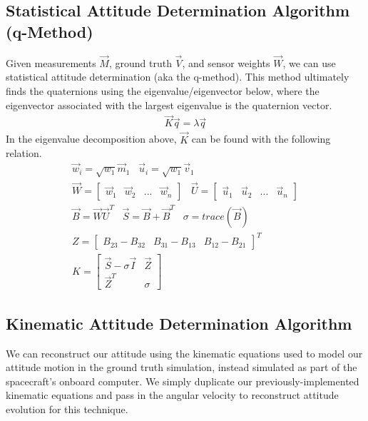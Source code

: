 \subsection{Statistical Attitude Determination Algorithm (q-Method)}
Given measurements $\Vec{M}$, ground truth $\Vec{V}$, and sensor weights $\Vec{W}$, we can use statistical attitude determination (aka the q-method). This method ultimately finds the quaternions using the eigenvalue/eigenvector below, where the eigenvector associated with the largest eigenvalue is the quaternion vector.
\begin{align*}
    \Vec{K} \Vec{q} = \lambda \Vec{q}
\end{align*}
In the eigenvalue decomposition above, $\Vec{K}$ can be found with the following relation.
\begin{align*}
    \Vec{w}_i = \sqrt{w_1} \Vec{m}_1 \;\;\;
    \Vec{u}_i = \sqrt{w_1} \Vec{v}_1 \\
    \Vec{W} = 
    \begin{bmatrix}
        \Vec{w}_1 & \Vec{w}_2 & ... & \Vec{w}_n
    \end{bmatrix} \;\;\;
    \Vec{U} = 
    \begin{bmatrix}
        \Vec{u}_1 & \Vec{u}_2 & ... & \Vec{u}_n
    \end{bmatrix} \\
    \Vec{B} = \Vec{W} \Vec{U}^T \;\;\;
    \Vec{S} = \Vec{B} + \Vec{B}^T \;\;\;
    \sigma = trace (\Vec{B}) \\
    Z = 
    \begin{bmatrix}
        B_{23} - B_{32} & B_{31} - B_{13} & B_{12} - B_{21}
    \end{bmatrix} ^T \\
    K = 
    \begin{bmatrix}
        \Vec{S} - \sigma \Vec{I} & \Vec{Z} \\
        \Vec{Z}^T & \sigma
    \end{bmatrix}
\end{align*}

\subsection{Kinematic Attitude Determination Algorithm}
We can reconstruct our attitude using the kinematic equations used to model our attitude motion in the ground truth simulation, instead simulated as part of the spacecraft's onboard computer. We simply duplicate our previously-implemented kinematic equations and pass in the angular velocity to reconstruct attitude evolution for this technique.

